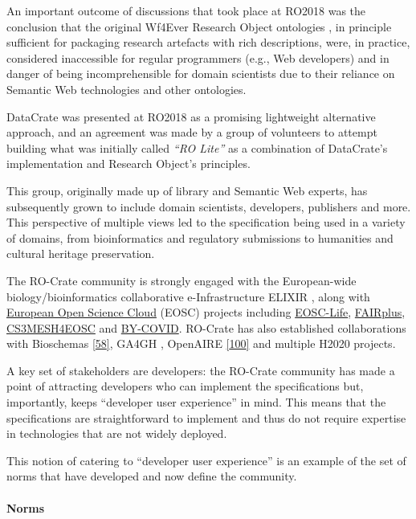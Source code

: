 {An important outcome of discussions that took place at RO2018 was the
conclusion that the original Wf4Ever Research Object ontologies
\cite{Belhajjame 2015}, in
principle sufficient for packaging research artefacts with rich
descriptions, were, in practice, considered inaccessible for regular
programmers (e.g., Web developers) and in danger of being
incomprehensible for domain scientists due to their reliance on Semantic
Web technologies and other ontologies.

DataCrate \cite{ch5-103} was
presented at RO2018 as a promising lightweight alternative approach, and
an agreement was made by a group of volunteers to attempt building what
was initially called \emph{``RO Lite''} as a combination of DataCrate's
implementation and Research Object's principles.

This group, originally made up of library and Semantic Web experts, has
subsequently grown to include domain scientists, developers, publishers
and more. This perspective of multiple views led to the specification
being used in a variety of domains, from bioinformatics and regulatory
submissions to humanities and cultural heritage preservation.

The RO-Crate community is strongly engaged with the European-wide
biology/bioinformatics collaborative e-Infrastructure ELIXIR
\cite{Crosswell 2012}, along
with \href{https://eosc.eu/}{European Open Science Cloud} (EOSC)
projects including \href{https://www.eosc-life.eu/}{EOSC-Life},
\href{https://fairplus-project.eu/}{FAIRplus},
\href{https://cs3mesh4eosc.eu/}{CS3MESH4EOSC} and
\href{https://by-covid.eu/}{BY-COVID}. RO-Crate has also established
collaborations with Bioschemas
\href{https://iswc2017.semanticweb.org/paper-579/}{{[}58{]}}, GA4GH
\cite{ch5-99}, OpenAIRE
\href{https://doi.org/10.5860/crln.76.6.9326}{{[}100{]}} and multiple
H2020 projects.

A key set of stakeholders are developers: the RO-Crate community has
made a point of attracting developers who can implement the
specifications but, importantly, keeps ``developer user experience'' in
mind. This means that the specifications are straightforward to
implement and thus do not require expertise in technologies that are not
widely deployed.

This notion of catering to ``developer user experience'' is an example
of the set of norms that have developed and now define the community.

\hypertarget{norms}{%
\paragraph{Norms}\label{norms}}

}
